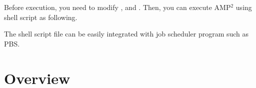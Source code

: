 \documentclass[letterpaper,10pt,english]{sphinxmanual}
\begin{document}
Before execution, you need to modify ,  and .
Then, you can execute AMP$^{\text{2}}$ using shell script as following.

\begin{sphinxVerbatim}[commandchars=\\\{\}]
 
\end{sphinxVerbatim}

The shell script file can be easily integrated with job scheduler program such
as PBS.


\chapter{Overview}
\label{\detokenize{Overview/Overview:overview}}\label{\detokenize{Overview/Overview::doc}}
\end{document}
